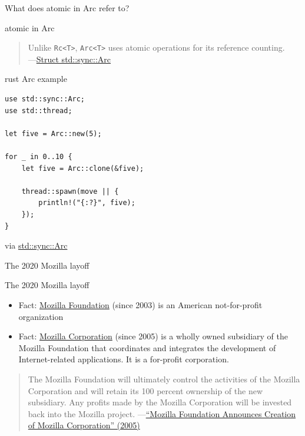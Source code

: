 \documentclass{beamer}
\begin{document}
\begin{frame}[standout]
  What does atomic in Arc refer to?
\end{frame}

\begin{frame}[fragile]{atomic in Arc}
  \begin{quote}
    Unlike \texttt{Rc<T>}, \texttt{Arc<T>} uses atomic operations for its reference counting. \\
    ---\href{https://doc.rust-lang.org/std/sync/struct.Arc.html}{Struct std::sync::Arc}
  \end{quote}
\end{frame}

\begin{frame}[fragile]{rust Arc example}
  \begin{verbatim}
use std::sync::Arc;
use std::thread;

let five = Arc::new(5);

for _ in 0..10 {
    let five = Arc::clone(&five);

    thread::spawn(move || {
        println!("{:?}", five);
    });
}
  \end{verbatim}

  via \href{https://doc.rust-lang.org/std/sync/struct.Arc.html}{std::sync::Arc}
\end{frame}

\begin{frame}[standout]
  The 2020 Mozilla layoff
\end{frame}

\begin{frame}[fragile]{The 2020 Mozilla layoff}
  \begin{itemize}
    \item Fact: \href{https://foundation.mozilla.org}{Mozilla Foundation} (since 2003) is an American not-for-profit organization
    \item Fact: \href{https://www.mozilla.org/}{Mozilla Corporation} (since 2005) is a wholly owned subsidiary of the Mozilla Foundation that coordinates and integrates the development of Internet-related applications. It is a for-profit corporation.
  \end{itemize}
  \begin{quote}
    The Mozilla Foundation will ultimately control the activities of the Mozilla Corporation and will retain its 100 percent ownership of the new subsidiary. Any profits made by the Mozilla Corporation will be invested back into the Mozilla project. 
    ---\href{https://web.archive.org/web/20060907025204/http://www.mozillazine.org/talkback.html?article=7085}{“Mozilla Foundation Announces Creation of Mozilla Corporation” (2005)}
  \end{quote}
\end{frame}
\end{document}
